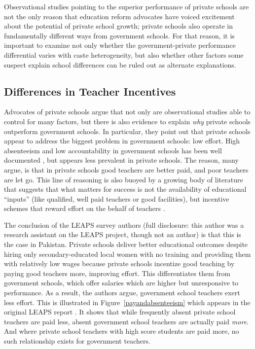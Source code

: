 \documentclass[Eubank_pk_ethnic_sorting.tex]{subfiles}
\begin{document}
Observational studies pointing to the superior performance of private schools are not the only reason that education reform advocates have voiced excitement about the potential of private school growth; private schools also operate in fundamentally different ways from government schools. For that reason, it is important to examine not only whether the government-private performance differential varies with caste heterogeneity, but also whether other factors some suspect explain school differences can be ruled out as alternate explanations. 


\subsection{Differences in Teacher Incentives}\label{incentives}

Advocates of private schools argue that not only are observational studies able to control for many factors, but there is also evidence to explain \emph{why} private schools outperform government schools. In particular, they point out that private schools appear to address the biggest problem in government schools: low effort. High absenteeism and low accountability in government schools has been well documented \citep{Muralidharan:2008tb, Chaudhury:2006vp}, but appears less prevalent in private schools. The reason, many argue, is that in private schools good teachers are better paid, and poor teachers are let go. This line of reasoning is also buoyed by a growing body of literature that suggests that what matters for success is not the availability of educational ``inputs'' (like qualified, well paid teachers or good facilities), but incentive schemes that reward effort on the behalf of teachers \citep{Hanushek:1997tt,Hanushek:2003hz,Banerjee:2007wx}.

The conclusion of the LEAPS survey authors (full disclosure: this author was a research assistant on the LEAPS project, though not an author) is that this is the case in Pakistan. Private schools deliver better educational outcomes despite hiring only secondary-educated local women with no training and providing them with relatively low wages because private schools incentize good teaching by paying good teachers more, improving effort. This differentiates them from government schools, which offer salaries which are higher but unresponsive to performance. As a result, the authors argue, government school teachers exert less effort. This is illustrated in Figure~\ref{payandabsenteeism} which appears in the original LEAPS report \citep{Andrabi:2007we}. It shows that while frequently absent private school teachers are paid less, absent government school teachers are actually paid \emph{more}. And where private school teachers with high score students are paid more, no such relationship exists for government teachers.
\end{document}
